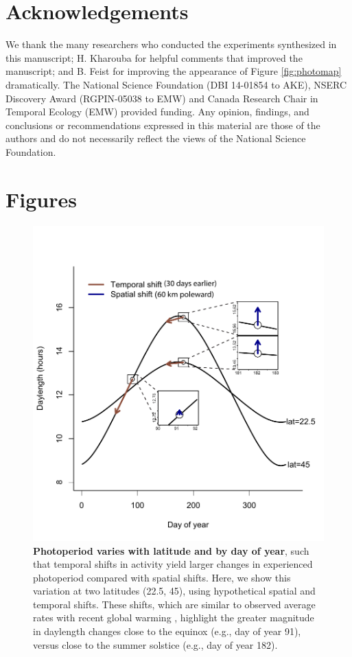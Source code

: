 \documentclass{article}
\begin{document}
\section*{Acknowledgements}
We thank the many researchers who conducted the experiments synthesized in this manuscript; H. Kharouba for helpful comments that improved the manuscript; and B. Feist for improving the appearance of Figure \ref{fig:photomap} dramatically. The National Science Foundation (DBI 14-01854 to AKE), NSERC Discovery Award (RGPIN-05038 to EMW) and Canada Research Chair in Temporal Ecology (EMW) provided funding. Any opinion, findings, and conclusions or recommendations expressed in this material are those of the authors and do not necessarily reflect the views of the National Science Foundation.

\clearpage


\section* {Figures}


\begin{figure}[p]
\centering
\includegraphics{..//..//analyses/photoperiod/figures/photo_spacetime_v2.pdf} %
\caption{\textbf{Photoperiod varies with latitude and by day of year}, such that temporal shifts in activity yield larger changes in experienced photoperiod compared with spatial shifts. Here, we show this variation at two latitudes (22.5\degree, 45\degree), using hypothetical spatial and temporal shifts. These shifts, which are similar to observed average rates with recent global warming \citep[e.g.,][]{parmesan2006,chen2011}, highlight the greater magnitude in daylength changes close to the equinox (e.g., day of year 91), versus close to the summer solstice (e.g., day of year 182).}
 \label{fig:spacetime}%
 \end{figure}
 
\end{document}
